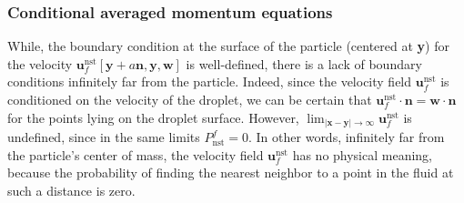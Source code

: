 
\subsubsection{Conditional averaged momentum equations}

While, the boundary condition at the surface of the particle (centered at \textbf{y}) for the velocity $\textbf{u}_f^\text{nst}[\textbf{y}+a \textbf{n}, \textbf{y},\textbf{w}]$ is well-defined, there is a lack of boundary conditions infinitely far from the particle. 
Indeed, since the velocity field $\textbf{u}_f^\text{nst}$ is conditioned on the velocity of the droplet, we can be certain that $\textbf{u}_f^\text{nst}\cdot \textbf{n} = \textbf{w}\cdot \textbf{n}$ for the points lying on the droplet surface. 
However, $\lim_{|\textbf{x}- \textbf{y}|\to \infty} \textbf{u}^\text{nst}_f$ is undefined, since in the same limits $P_\text{nst}^f = 0$.
In other words, infinitely far from the particle's center of mass, the velocity field $\textbf{u}^\text{nst}_f$ has no physical meaning, because the probability of finding the nearest neighbor to a point in the fluid at such a distance is zero.


